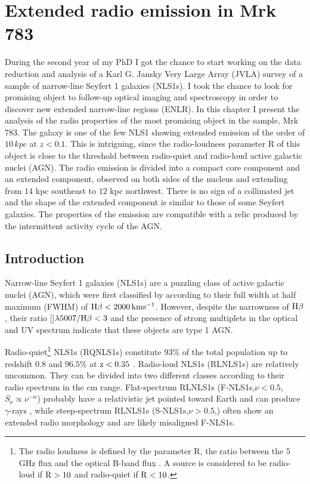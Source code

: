 \documentclass[../main.tex]{subfiles}
\begin{document}
\chapter[Extended radio emission in Mrk 783]{Extended radio emission in Mrk 783}
\label{cap:paper2}

During the second year of my PhD I got the chance to start working on the data reduction and analysis of a Karl G. Jansky Very Large Array (JVLA) survey of a sample of narrow-line Seyfert 1 galaxies (NLS1s).
I took the chance to look for promising object to follow-up optical imaging and spectroscopy in order to discover new extended narrow-line regions (ENLR).
In this chapter I present the analysis of the radio properties of the most promising object in the sample, Mrk 783.
The galaxy is one of the few NLS1 showing extended emission of the order of $10\,\si{kpc}$ at $z<0.1$.
This is intriguing, since the radio-loudness parameter R of this object is close to the threshold between radio-quiet and radio-loud active galactic nuclei (AGN).
The radio emission is divided into a compact core component and an extended component, observed on both sides of the nucleus and extending from $14$ kpc southeast to $12$ kpc northwest.
There is no sign of a collimated jet and the shape of the extended component is similar to those of some Seyfert galaxies.
The properties of the emission are compatible with a relic produced by the intermittent activity cycle of the AGN.

\section{Introduction}
Narrow-line Seyfert 1 galaxies (NLS1s) are a puzzling class of active galactic nuclei (AGN), which were first classified by \citet{Osterbrock85} according to their full width at half maximum (FWHM) of $\rm H\beta < 2000\,km s^{-1}$. 
However, despite the narrowness of $\rm H\beta$, their ratio []$\lambda5007/\rm H\beta< 3$ and the presence of strong  multiplets in the optical and UV spectrum indicate that these objects are type 1 AGN. 

Radio-quiet\footnote{The radio loudness is defined by the parameter R, the ratio between the $5$ GHz flux and the optical B-band flux \citep{Kellermann89}. A source is considered to be radio-loud if $\rm R>10$ and radio-quiet if $\rm R <10$.} NLS1s (RQNLS1s) constitute $93\%$ of the total population up to redshift $0.8$ \citep{Komossa06} and $96.5\%$ at $\rm z<0.35$ \citep{Cracco16}.
Radio-loud NLS1s (RLNLS1s) are relatively uncommon.
They can be divided into two different classes according to their radio spectrum in the cm range.
Flat-spectrum RLNLS1s (F-NLS1s,$\nu<0.5$, $S_{\nu}\propto\nu^{-\alpha}$) probably have a relativistic jet pointed toward Earth and can produce $\gamma$-rays \citep{Abdo09a, Abdo09b}, while steep-spectrum RLNLS1s (S-NLS1s,$\nu>0.5$,) often show an extended radio morphology and are likely misaligned F-NLS1s. 
\end{document}
